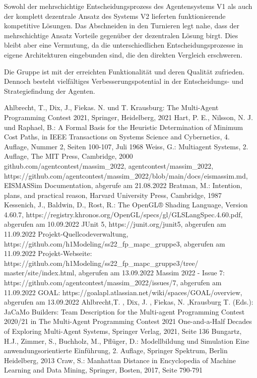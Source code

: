 \documentclass[runningheads]{llncs}
\begin{document}
Sowohl der mehrschichtige Entscheidungsprozess des Agentensystems V1 als auch der komplett dezentrale Ansatz des Systems V2 lieferten funktionierende kompetitive Lösungen. Das Abschneiden in den Turnieren legt nahe, dass der mehrschichtige Ansatz Vorteile gegenüber der dezentralen Lösung birgt. Dies bleibt aber eine Vermutung, da die unterschiedlichen Entscheidungsprozesse in eigene Architekturen eingebunden sind, die den direkten Vergleich erschweren.

Die Gruppe ist mit der erreichten Funktionalität und deren Qualität zufrieden. Dennoch besteht vielfältiges Verbesserungspotential in der Entscheidungs- und Strategiefindung der Agenten.

%
%
%
% 
% 
%
\begin{thebibliography}{8}
	Ahlbrecht, T., Dix, J., Fiekas. N. und T. Krausburg: The Multi-Agent Programming Contest 2021, Springer, Heidelberg, 2021
	Hart, P. E., Nilsson, N. J. und Raphael, B.: A Formal Basis for the Heuristic Determination of Minimum Cost Paths, in IEEE Transactions on Systems Science and Cybernetics, 4. Auflage, Nummer 2, Seiten 100-107, Juli 1968
	Weiss, G.: Multiagent Systems, 2. Auflage, The MIT Press, Cambridge, 2000
	github.com/agentcontest/massim\_2022, agentcontest/massim\_2022, \\ https://github.com/agentcontest/massim\_2022/blob/main/docs/eismassim.md, EISMASSim Documentation, abgerufe am 21.08.2022
	Bratman, M.: Intention, plans, and practical reason, Harvard University Press, Cambridge, 1987
	Kessenich, J., Baldwin, D., Rost, R.: The OpenGL® Shading Language, Version 4.60.7, https://registry.khronos.org/OpenGL/specs/gl/GLSLangSpec.4.60.pdf, abgerufen am 10.09.2022
	JUnit 5, https://junit.org/junit5, abgerufen am 11.09.2022
	Projekt-Quellcodeverwaltung, https://github.com/h1Modeling/ss22\_fp\_mapc\_gruppe3, abgerufen am 11.09.2022
	Projekt-Webseite: https://github.com/h1Modeling/ss22\_fp\_mapc\_gruppe3/tree/ master/site/index.html, abgerufen am 13.09.2022
	Massim 2022 - Issue 7: https://github.com/agentcontest/massim\_2022/issues/7, abgerufen am 11.09.2022
	GOAL: https://goalapl.atlassian.net/wiki/spaces/GOAL/overview, abgerufen am 13.09.2022
	Ahlbrecht,T. , Dix, J. , Fiekas, N. ,Krausburg T. (Eds.): JaCaMo Builders: Team Description for the Multi-agent Programming Contest 2020/21  in The Multi-Agent Programming Contest 2021 One-and-a-Half Decades of Exploring Multi-Agent Systems, Springer Verlag, 2021, Seite 136
	Bungartz, H.J., Zimmer, S., Buchholz, M., Pflüger, D.: Modellbildung und Simulation Eine anwendungsorientierte Einführung, 2. Auflage, Springer Spektrum, Berlin Heidelberg, 2013
Craw, S.: Manhattan Distance in Encyclopedia of Machine Learning and Data Mining, Springer, Bosten, 2017, Seite 790-791	
\end{thebibliography}
\end{document}
